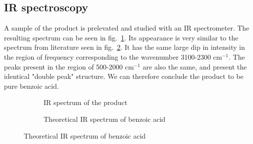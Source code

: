 \documentclass{article}
\begin{document}
\subsection{IR spectroscopy}

A sample of the product is prelevated and studied with an IR spectrometer. The resulting spectrum can be seen in fig.~\ref{fig:IRSexp}. Its appearance is very similar to the spectrum from literature seen in fig.~\ref{fig:IRStheo}. It has the same large dip in intensity in the region of frequency corresponding to the wavenumber 3100-2300 cm$^{-1}$. The peaks present in the region of 500-2000 cm$^{-1}$ are also the same, and present the identical "double peak" structure. We can therefore conclude the product to be pure benzoic acid.

\begin{figure}[!ht]
    \centering
    \begin{subfigure}{0.45\textwidth}
        \caption{IR spectrum of the product}
        \label{fig:IRSexp}
    \end{subfigure}
    \begin{subfigure}{0.45\textwidth}
        \caption{Theoretical IR spectrum of benzoic acid \cite{IRStheo}}
        \label{fig:IRStheo}
    \end{subfigure}
    \label{IR spectra}
    \label{IRS}
\end{figure}
\FloatBarrier
\end{document}
